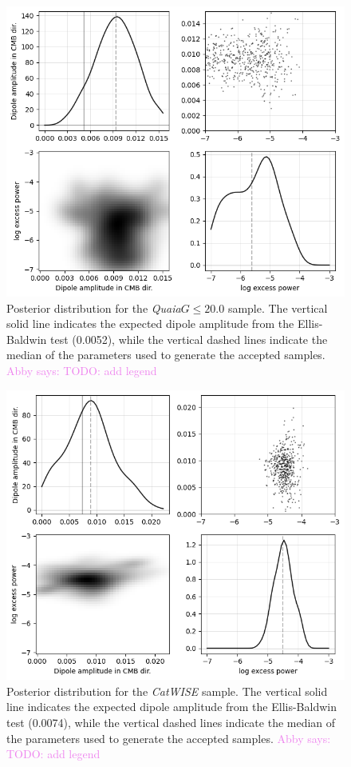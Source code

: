 \documentclass[modern]{aastex631}
\newcommand{\abby}[1]{\textcolor{violet}{Abby says: #1}}
\newcommand{\catwise}{\textsl{CatWISE}\xspace}
\newcommand{\quaia}{\textsl{Quaia}\xspace}
\begin{document}
\begin{figure}
    \centering
    \includegraphics[width=0.6\linewidth]{images/quaia_posterior.png}
    \caption{Posterior distribution for the \quaia $G\le 20.0$ sample. The vertical solid line indicates the expected dipole amplitude from the Ellis-Baldwin test (0.0052), while the vertical dashed lines indicate the median of the parameters used to generate the accepted samples. \abby{TODO: add legend}}
    \label{fig:quaia_posterior}
\end{figure}

\begin{figure}
    \centering
    \includegraphics[width=0.6\linewidth]{images/catwise_posterior.png}
    \caption{Posterior distribution for the \catwise sample. The vertical solid line indicates the expected dipole amplitude from the Ellis-Baldwin test (0.0074), while the vertical dashed lines indicate the median of the parameters used to generate the accepted samples. \abby{TODO: add legend}}
    \label{fig:catwise_posterior}
\end{figure}
\end{document}
